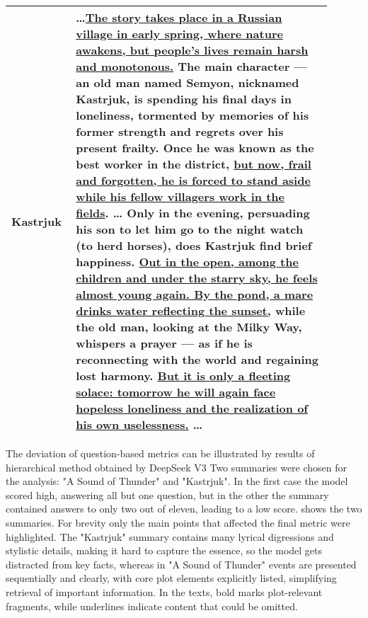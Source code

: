\documentclass{superfri}
\begin{document}
{\begin{tabular}{|p{0.15\linewidth}|p{0.75\linewidth}|}
    \textbf{Kastrjuk} & \dots \uline{The story takes place in a Russian village in early spring, 
    where nature awakens, but people’s lives remain harsh and monotonous.} \textbf{The main character — an old man named Semyon, nicknamed Kastrjuk}, 
    is spending his final days in loneliness, \textbf{tormented by memories of his former strength} and regrets over his present frailty. \textbf{Once he was known as the best worker in the district}, 
    \uline{but now, frail and forgotten, he is forced to stand aside while his fellow villagers work in the fields}. \dots
    \textbf{Only in the evening, persuading his son to let him go to the night watch (to herd horses), does Kastrjuk find brief happiness}. \uline{Out in the open, among the children and under the starry sky, he feels almost young again. 
    By the pond, a mare drinks water reflecting the sunset,} while the \textbf{old man, looking at the Milky Way, whispers a prayer — as if he is reconnecting with the world and regaining lost harmony}. 
    \uline{But it is only a fleeting solace: tomorrow he will again face hopeless loneliness and the realization of his own uselessness.} \dots
    \\ \hline

  \end{tabular}
}

The deviation of question-based metrics can be illustrated by results of hierarchical method obtained by DeepSeek V3
Two summaries were chosen for the analysis: "A Sound of Thunder" and "Kastrjuk".
In the first case the model scored high, answering all but one question, but in the other the summary contained answers to only two out of eleven, leading to a low score. 
 shows the two summaries. For brevity only the main points that affected the final metric were highlighted.
The "Kastrjuk" summary contains many lyrical digressions and stylistic details, making it hard to capture the essence, so the model gets distracted from key facts, 
whereas in "A Sound of Thunder" events are presented sequentially and clearly, with core plot elements explicitly listed, simplifying retrieval of important information.
In the texts, bold marks plot-relevant fragments, while underlines indicate content that could be omitted.
\end{document}
